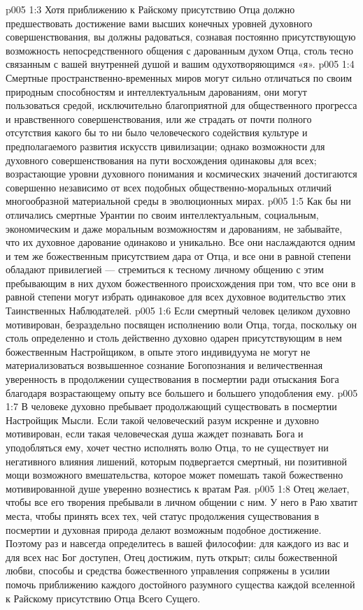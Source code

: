 \vs p005 1:3 \pc Хотя приближению к Райскому присутствию Отца должно предшествовать достижение вами высших конечных уровней духовного совершенствования, вы должны радоваться, сознавая постоянно присутствующую возможность непосредственного общения с дарованным духом Отца, столь тесно связанным с вашей внутренней душой и вашим одухотворяющимся «я».
\vs p005 1:4 Смертные пространственно\hyp{}временных миров могут сильно отличаться по своим природным способностям и интеллектуальным дарованиям, они могут пользоваться средой, исключительно благоприятной для общественного прогресса и нравственного совершенствования, или же страдать от почти полного отсутствия какого бы то ни было человеческого содействия культуре и предполагаемого развития искусств цивилизации; однако возможности для духовного совершенствования на пути восхождения одинаковы для всех; возрастающие уровни духовного понимания и космических значений достигаются совершенно независимо от всех подобных общественно\hyp{}моральных отличий многообразной материальной среды в эволюционных мирах.
\vs p005 1:5 Как бы ни отличались смертные Урантии по своим интеллектуальным, социальным, экономическим и даже моральным возможностям и дарованиям, не забывайте, что их духовное дарование одинаково и уникально. Все они наслаждаются одним и тем же божественным присутствием дара от Отца, и все они в равной степени обладают привилегией --- стремиться к тесному личному общению с этим пребывающим в них духом божественного происхождения при том, что все они в равной степени могут избрать одинаковое для всех духовное водительство этих Таинственных Наблюдателей.
\vs p005 1:6 \pc Если смертный человек целиком духовно мотивирован, безраздельно посвящен исполнению воли Отца, тогда, поскольку он столь определенно и столь действенно духовно одарен присутствующим в нем божественным Настройщиком, в опыте этого индивидуума не могут не материализоваться возвышенное сознание Богопознания и величественная уверенность в продолжении существования в посмертии ради отыскания Бога благодаря возрастающему опыту все большего и большего уподобления ему.
\vs p005 1:7 В человеке духовно пребывает продолжающий существовать в посмертии Настройщик Мысли. Если такой человеческий разум искренне и духовно мотивирован, если такая человеческая душа жаждет познавать Бога и уподобляться ему, хочет честно исполнять волю Отца, то не существует ни негативного влияния лишений, которым подвергается смертный, ни позитивной мощи возможного вмешательства, которое может помешать такой божественно мотивированной душе уверенно вознестись к вратам Рая.
\vs p005 1:8 Отец желает, чтобы все его творения пребывали в личном общении с ним. У него в Раю хватит места, чтобы принять всех тех, чей статус продолжения существования в посмертии и духовная природа делают возможным подобное достижение. Поэтому раз и навсегда определитесь в вашей философии: для каждого из вас и для всех нас Бог доступен, Отец достижим, путь открыт; силы божественной любви, способы и средства божественного управления сопряжены в усилии помочь приближению каждого достойного разумного существа каждой вселенной к Райскому присутствию Отца Всего Сущего.
